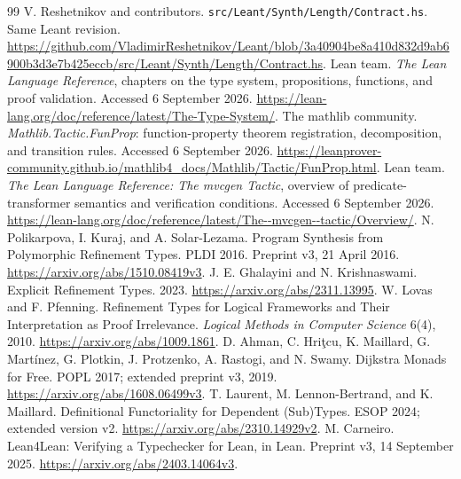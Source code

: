\documentclass[11pt,a4paper]{article}
\newcommand{\code}[1]{\nolinkurl{#1}}
\theoremstyle{plain}
\theoremstyle{definition}
\theoremstyle{remark}
\begin{document}
\begin{thebibliography}{99}
 V. Reshetnikov and contributors. \code{src/Leant/Synth/Length/Contract.hs}. Same Leant revision. \url{https://github.com/VladimirReshetnikov/Leant/blob/3a40904be8a410d832d9ab6900b3d3e7b425eccb/src/Leant/Synth/Length/Contract.hs}.
 Lean team. \emph{The Lean Language Reference}, chapters on the type system, propositions, functions, and proof validation. Accessed 6 September 2026. \url{https://lean-lang.org/doc/reference/latest/The-Type-System/}.
 The mathlib community. \emph{Mathlib.Tactic.FunProp}: function-property theorem registration, decomposition, and transition rules. Accessed 6 September 2026. \url{https://leanprover-community.github.io/mathlib4_docs/Mathlib/Tactic/FunProp.html}.
 Lean team. \emph{The Lean Language Reference: The mvcgen Tactic}, overview of predicate-transformer semantics and verification conditions. Accessed 6 September 2026. \url{https://lean-lang.org/doc/reference/latest/The--mvcgen--tactic/Overview/}.
 N. Polikarpova, I. Kuraj, and A. Solar-Lezama. Program Synthesis from Polymorphic Refinement Types. PLDI 2016. Preprint v3, 21 April 2016. \url{https://arxiv.org/abs/1510.08419v3}.
 J. E. Ghalayini and N. Krishnaswami. Explicit Refinement Types. 2023. \url{https://arxiv.org/abs/2311.13995}.
 W. Lovas and F. Pfenning. Refinement Types for Logical Frameworks and Their Interpretation as Proof Irrelevance. \emph{Logical Methods in Computer Science} 6(4), 2010. \url{https://arxiv.org/abs/1009.1861}.
 D. Ahman, C. Hri\c{t}cu, K. Maillard, G. Mart\'inez, G. Plotkin, J. Protzenko, A. Rastogi, and N. Swamy. Dijkstra Monads for Free. POPL 2017; extended preprint v3, 2019. \url{https://arxiv.org/abs/1608.06499v3}.
 T. Laurent, M. Lennon-Bertrand, and K. Maillard. Definitional Functoriality for Dependent (Sub)Types. ESOP 2024; extended version v2. \url{https://arxiv.org/abs/2310.14929v2}.
 M. Carneiro. Lean4Lean: Verifying a Typechecker for Lean, in Lean. Preprint v3, 14 September 2025. \url{https://arxiv.org/abs/2403.14064v3}.
\end{thebibliography}
\end{document}
